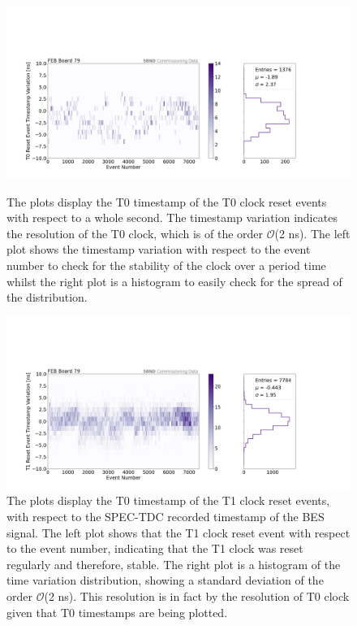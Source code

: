 \begin{figure}[htbp!] 
\centering    
\includegraphics[width=1.0\textwidth]{upstream_T0stability_combined_board79}
\caption[upstream_T0stability_combined_board79]{
The plots display the T0 timestamp of the T0 clock reset events with respect to a whole second. 
The timestamp variation indicates the resolution of the T0 clock, which is of the order $\mathcal{O}$(2 ns).
The left plot shows the timestamp variation with respect to the event number to check for the stability of the clock over a period time whilst the right plot is a histogram to easily check for the spread of the distribution.
}
\label{fig:upstream_T0stability_combined_board79}

\centering    
\includegraphics[width=1.0\textwidth]{upstream_T1stability_combined_board79}
\caption[upstream_T1stability_combined_board79]{
The plots display the T0 timestamp of the T1 clock reset events, with respect to the SPEC-TDC recorded timestamp of the BES signal. 
The left plot shows that the T1 clock reset event with respect to the event number, indicating that the T1 clock was reset regularly and therefore, stable.
The right plot is a histogram of the time variation distribution, showing a standard deviation of the order $\mathcal{O}$(2 ns).
This resolution is in fact by the resolution of T0 clock given that T0 timestamps are being plotted. 
}
\label{fig:upstream_T1stability_combined_board79}
\end{figure}

